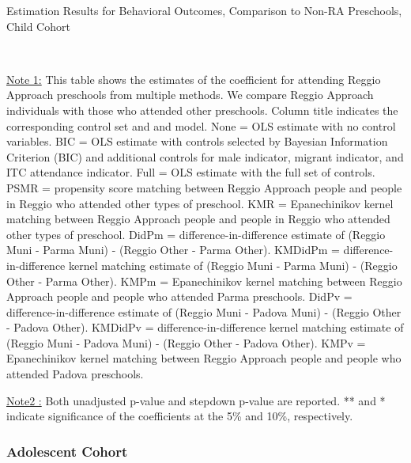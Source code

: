 \begin{table}[H] \caption{Estimation Results for Behavioral Outcomes, Comparison to Non-RA Preschools, Child Cohort} \label{ols-B-child-reg-reli}
\scalebox{0.59}{}
\vspace{1ex} \\
{\footnotesize\raggedright{\underline{Note 1:} This table shows the estimates of the coefficient for attending Reggio Approach preschools from multiple methods. We compare Reggio Approach individuals with those who attended other preschools. Column title indicates the corresponding control set and and model. None = OLS estimate with no control variables. BIC = OLS estimate with controls selected by Bayesian Information Criterion (BIC) and additional controls for male indicator, migrant indicator, and ITC attendance indicator. Full = OLS estimate with the full set of controls. PSMR =  propensity score matching between Reggio Approach people and people in Reggio who attended other types of preschool. KMR = Epanechinikov kernel matching between Reggio Approach people and people in Reggio who attended other types of preschool. DidPm = difference-in-difference estimate of (Reggio Muni - Parma Muni) - (Reggio Other - Parma Other). KMDidPm = difference-in-difference kernel matching estimate of (Reggio Muni - Parma Muni) - (Reggio Other - Parma Other).   KMPm = Epanechinikov kernel matching between Reggio Approach people and people who attended Parma preschools. DidPv = difference-in-difference estimate of (Reggio Muni - Padova Muni) - (Reggio Other - Padova Other). KMDidPv = difference-in-difference kernel matching estimate of (Reggio Muni - Padova Muni) - (Reggio Other - Padova Other).  KMPv = Epanechinikov kernel matching between Reggio Approach people and people who attended Padova preschools.}

\footnotesize\raggedright{\underline{Note2 :} Both unadjusted p-value and stepdown p-value are reported. ** and * indicate significance of the coefficients at the 5\% and 10\%, respectively.}\\}
\end{table}

\subsubsection{Adolescent Cohort}

\clearpage

